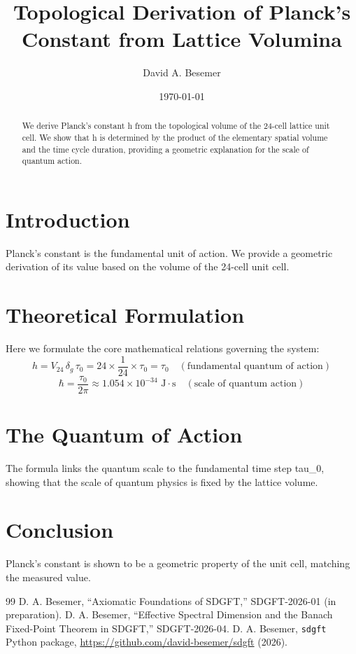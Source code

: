 \documentclass[amsmath,amssymb,aps,prd,twocolumn,superscriptaddress,nofootinbib]{revtex4-2}
\begin{document}

\title{Topological Derivation of Planck's Constant from Lattice Volumina}

\author{David A. Besemer}

\date{\today}

\begin{abstract}
We derive Planck's constant h from the topological volume of the 24-cell lattice unit cell. We show that h is determined by the product of the elementary spatial volume and the time cycle duration, providing a geometric explanation for the scale of quantum action.
\end{abstract}

\maketitle

\section{Introduction}
Planck's constant is the fundamental unit of action. We provide a geometric derivation of its value based on the volume of the 24-cell unit cell.

\section{Theoretical Formulation}
Here we formulate the core mathematical relations governing the system:
\begin{equation}
  h = V_{24}\,\delta_g\,\tau_0 = 24 \times \frac{1}{24} \times \tau_0 = \tau_0 \quad (\text{fundamental quantum of action})
\end{equation}
\begin{equation}
  \hbar = \frac{\tau_0}{2\pi} \approx 1.054 \times 10^{-34} \text{ J}\cdot\text{s} \quad (\text{scale of quantum action})
\end{equation}
\section{The Quantum of Action}
The formula links the quantum scale to the fundamental time step tau_0, showing that the scale of quantum physics is fixed by the lattice volume.

\section{Conclusion}
Planck's constant is shown to be a geometric property of the unit cell, matching the measured value.



\begin{thebibliography}{99}
 D. A. Besemer, ``Axiomatic Foundations of SDGFT,'' SDGFT-2026-01 (in preparation).
 D. A. Besemer, ``Effective Spectral Dimension and the Banach Fixed-Point Theorem in SDGFT,'' SDGFT-2026-04.
 D. A. Besemer, \texttt{sdgft} Python package, \url{https://github.com/david-besemer/sdgft} (2026).
\end{thebibliography}
\end{document}
